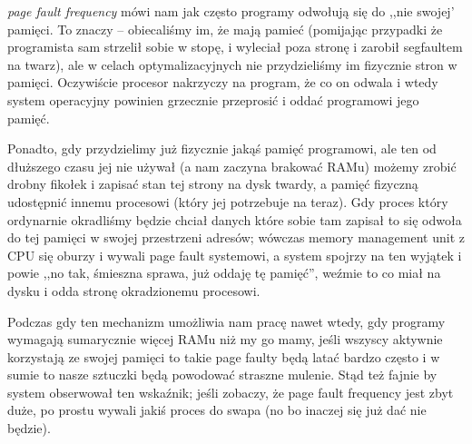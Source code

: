 \textit{page fault frequency} mówi nam jak często programy odwołują się do ,,nie swojej' pamięci.
To znaczy -- obiecaliśmy im, że mają pamieć (pomijając przypadki że programista sam strzelił sobie w stopę, i wyleciał poza stronę i zarobił segfaultem na twarz), ale w celach optymalizacyjnych nie przydzieliśmy im fizycznie stron w pamięci. Oczywiście procesor nakrzyczy na program, że co on odwala i wtedy system operacyjny powinien grzecznie przeprosić i oddać programowi jego pamięć.

Ponadto, gdy przydzielimy już fizycznie jakąś pamięć programowi, ale ten od dłuższego czasu jej nie używał (a nam zaczyna brakować RAMu) możemy zrobić drobny fikołek i zapisać stan tej strony na dysk twardy, a pamięć fizyczną udostępnić innemu procesowi (który jej potrzebuje na teraz). Gdy proces który ordynarnie okradliśmy będzie chciał danych które sobie tam zapisał to się odwoła do tej pamięci w swojej przestrzeni adresów; wówczas memory management unit z CPU się oburzy i wywali page fault systemowi, a system spojrzy na ten wyjątek i powie ,,no tak, śmieszna sprawa, już oddaję tę pamięć'', weźmie to co miał na dysku i odda stronę okradzionemu procesowi.

Podczas gdy ten mechanizm umożliwia nam pracę nawet wtedy, gdy programy wymagają sumarycznie więcej RAMu niż my go mamy, jeśli wszyscy aktywnie korzystają ze swojej pamięci to takie page faulty będą latać bardzo często i w sumie to nasze sztuczki będą powodować straszne mulenie. Stąd też fajnie by system obserwował ten wskaźnik; jeśli zobaczy, że page fault frequency jest zbyt duże, po prostu wywali jakiś proces do swapa (no bo inaczej się już dać nie będzie).